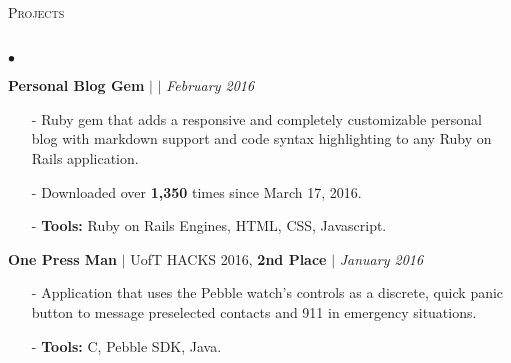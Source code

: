 \documentclass[11pt]{article}
\newcommand{\lineunder}{\vspace*{-8pt} \\ \hspace*{-18pt} \hrulefill \\}
\newcommand{\header}[1]{{\hspace*{-15pt}\vspace*{6pt} \textsc{#1}} \vspace*{-6pt} \lineunder }
\newenvironment{achievements}{\begin{list}{$\bullet$}{\topsep 0pt \itemsep -1.5pt \leftmargin 5pt}}{\vspace*{4pt}\end{list}}
\begin{document}
\header{\fontsize{11.1}{10}\selectfont Projects}
\begin{achievements}
\def\UrlFont{\em}
\item \textbf{Personal Blog Gem}  $|$  \href{https://github.com/nakulpathak3/personal-blog-gem}{\faGithub}  $|$ \href{https://rubygems.org/gems/personal_blog}{\faExternalLink} \hfill \textit {February 2016}
\begin{itemize}
\item[-]Ruby gem that adds a responsive and completely customizable personal blog with markdown support and code syntax highlighting to any Ruby on Rails application.
\vspace{2pt}
\item[-]Downloaded over \textbf{1,350} times since March 17, 2016.
\vspace{2pt}
\item[-]\textbf{Tools:} Ruby on Rails Engines, HTML, CSS, Javascript.
\end{itemize}

\vspace{3pt}

\item \textbf{One Press Man} {$|$ \scriptsize UofT HACKS 2016, \textbf{2nd Place}} $|$  \href{https://github.com/adrianmachado/Onepressman}{\faGithub} \hfill \textit {January 2016}
\begin{itemize}
\item[-]Application that uses the Pebble watch's controls as a discrete, quick panic button to message preselected contacts and 911 in emergency situations.
\vspace{2pt}
\item[-]\textbf{Tools:} C, Pebble SDK, Java.
\end{itemize}




\end{achievements}
\end{document}
